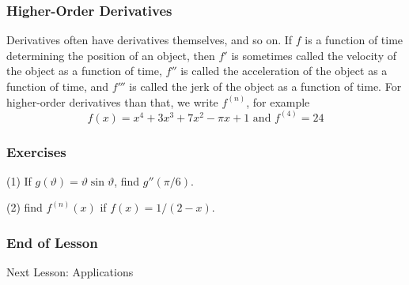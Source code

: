 \documentclass[xcolor=dvipsnames]{beamer}
\begin{document}
\begin{frame}
  \frametitle{Higher-Order Derivatives}
Derivatives often have derivatives themselves, and so on. If $f$ is a
function of time determining the position of an object, then $f'$ is
sometimes called the velocity of the object as a function of time,
$f''$ is called the acceleration of the object as a function of time,
and $f'''$ is called the jerk of the object as a function of time. For
higher-order derivatives than that, we write $f^{(n)}$, for example
\begin{equation}
  \label{eq:zeitohke}
  f(x)=x^{4}+3x^{3}+7x^{2}-\pi{}x+1\mbox{ and }f^{(4)}=24
\end{equation}
\end{frame}

\begin{frame}
  \frametitle{Exercises}
(1) If $g(\vartheta)=\vartheta\sin\vartheta$, find $g''(\pi/6)$.

\bigskip

(2) find $f^{(n)}(x)$ if $f(x)=1/(2-x)$.
\end{frame}

\begin{frame}
  \frametitle{End of Lesson}
Next Lesson: Applications
\end{frame}
\end{document}
